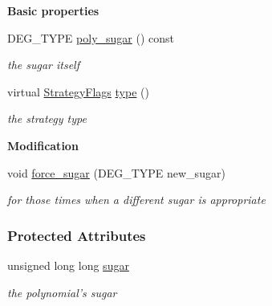 \begin{Indent}\textbf{ Basic properties}\par
\begin{DoxyCompactItemize}
\item 
\mbox{\label{group__strategygroup_a3b6ef678b640a3138e43882b9d2dca5f}} 
D\+E\+G\+\_\+\+T\+Y\+PE \hyperlink{group__strategygroup_a3b6ef678b640a3138e43882b9d2dca5f}{poly\+\_\+sugar} () const
\begin{DoxyCompactList}\small\item\em the sugar itself \end{DoxyCompactList}\item 
\mbox{\label{group__strategygroup_a36704dfc77b9007bf5f249e55bfde0ef}} 
virtual \hyperlink{group__strategygroup_ga0ee6c8e033547330e6b89929730007f4}{Strategy\+Flags} \hyperlink{group__strategygroup_a36704dfc77b9007bf5f249e55bfde0ef}{type} ()
\begin{DoxyCompactList}\small\item\em the strategy type \end{DoxyCompactList}\end{DoxyCompactItemize}
\end{Indent}
\begin{Indent}\textbf{ Modification}\par
\begin{DoxyCompactItemize}
\item 
\mbox{\label{group__strategygroup_a945416871509370e2222c8c7abe01759}} 
void \hyperlink{group__strategygroup_a945416871509370e2222c8c7abe01759}{force\+\_\+sugar} (D\+E\+G\+\_\+\+T\+Y\+PE new\+\_\+sugar)
\begin{DoxyCompactList}\small\item\em for those times when a different sugar is appropriate \end{DoxyCompactList}\end{DoxyCompactItemize}
\end{Indent}
\subsubsection*{Protected Attributes}
\begin{DoxyCompactItemize}
\item 
\mbox{\label{group__strategygroup_a125902ea0a800d9545937930e4537040}} 
unsigned long long \hyperlink{group__strategygroup_a125902ea0a800d9545937930e4537040}{sugar}
\begin{DoxyCompactList}\small\item\em the polynomial's sugar \end{DoxyCompactList}\end{DoxyCompactItemize}
